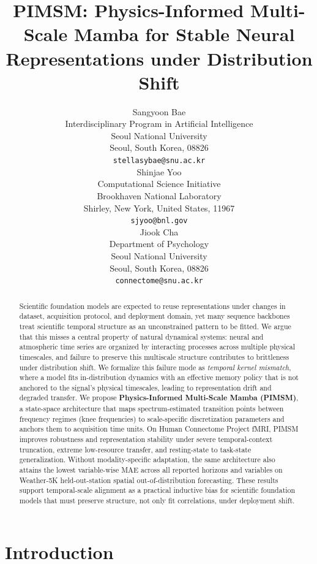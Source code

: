 \documentclass{article}
\title{PIMSM: Physics-Informed Multi-Scale Mamba for Stable Neural Representations under Distribution Shift}
\author{%
  Sangyoon Bae \\
  Interdisciplinary Program in Artificial Intelligence \\
  Seoul National University \\
  Seoul, South Korea, 08826 \\
  \texttt{stellasybae@snu.ac.kr} \\
  \And
  Shinjae Yoo \\
  Computational Science Initiative \\
  Brookhaven National Laboratory \\
  Shirley, New York, United States, 11967 \\
  \texttt{sjyoo@bnl.gov} \\
  \And
  Jiook Cha \\
  Department of Psychology \\
  Seoul National University \\
  Seoul, South Korea, 08826 \\
  \texttt{connectome@snu.ac.kr} \\
}
\begin{document}
\maketitle


\begin{abstract}
Scientific foundation models are expected to reuse representations under changes in dataset, acquisition protocol, and deployment domain, yet many sequence backbones treat scientific temporal structure as an unconstrained pattern to be fitted. We argue that this misses a central property of natural dynamical systems: neural and atmospheric time series are organized by interacting processes across multiple physical timescales, and failure to preserve this multiscale structure contributes to brittleness under distribution shift. We formalize this failure mode as \emph{temporal kernel mismatch}, where a model fits in-distribution dynamics with an effective memory policy that is not anchored to the signal's physical timescales, leading to representation drift and degraded transfer. We propose \textbf{Physics-Informed Multi-Scale Mamba (PIMSM)}, a state-space architecture that maps spectrum-estimated transition points between frequency regimes (knee frequencies) to scale-specific discretization parameters and anchors them to acquisition time units. On Human Connectome Project fMRI, PIMSM improves robustness and representation stability under severe temporal-context truncation, extreme low-resource transfer, and resting-state to task-state generalization. Without modality-specific adaptation, the same architecture also attains the lowest variable-wise MAE across all reported horizons and variables on Weather-5K held-out-station spatial out-of-distribution forecasting. These results support temporal-scale alignment as a practical inductive bias for scientific foundation models that must preserve structure, not only fit correlations, under deployment shift.
\end{abstract}

\section{Introduction}
\label{sec:introduction}
\end{document}
